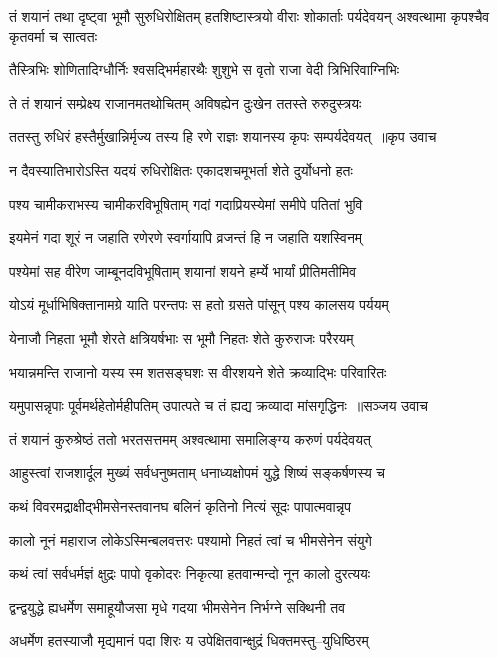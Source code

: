 \threelineshloka
{तं शयानं तथा दृष्ट्वा भूमौ सुरुधिरोक्षितम्}
{हतशिष्टास्त्रयो वीराः शोकार्ताः पर्यदेवयन्}
{अश्वत्थामा कृपश्चैव कृतवर्मा च सात्वतः}


\twolineshloka
{तैस्त्रिभिः शोणितादिग्धौर्निः श्वसद्भिर्महारथैः}
{शुशुभे स वृतो राजा वेदी त्रिभिरिवाग्निभिः}


\twolineshloka
{ते तं शयानं सम्प्रेक्ष्य राजानमतथोचितम्}
{अविषह्येन दुःखेन ततस्ते रुरुदुस्त्रयः}


\threelineshloka
{ततस्तु रुधिरं हस्तैर्मुखान्निर्मृज्य तस्य हि}
{रणे राज्ञः शयानस्य कृपः सम्पर्यदेवयत् ॥कृप उवाच}
{}


\twolineshloka
{न दैवस्यातिभारोऽस्ति यदयं रुधिरोक्षितः}
{एकादशचमूभर्ता शेते दुर्योधनो हतः}


\twolineshloka
{पश्य चामीकराभस्य चामीकरविभूषिताम्}
{गदां गदाप्रियस्येमां समीपे पतितां भुवि}


\twolineshloka
{इयमेनं गदा शूरं न जहाति रणेरणे}
{स्वर्गायापि व्रजन्तं हि न जहाति यशस्विनम्}


\twolineshloka
{पश्येमां सह वीरेण जाम्बूनदविभूषिताम्}
{शयानां शयने हर्म्ये भार्यां प्रीतिमतीमिव}


\twolineshloka
{योऽयं मूर्धाभिषिक्तानामग्रे याति परन्तपः}
{स हतो ग्रसते पांसून् पश्य कालसय पर्ययम्}


\twolineshloka
{येनाजौ निहता भूमौ शेरते क्षत्रियर्षभाः}
{स भूमौ निहतः शेते कुरुराजः परैरयम्}


\twolineshloka
{भयान्नमन्ति राजानो यस्य स्म शतसङ्घशः}
{स वीरशयने शेते क्रव्याद्भिः परिवारितः}


\threelineshloka
{यमुपासन्नृपाः पूर्वमर्थहेतोर्महीपतिम्}
{उपात्पते च तं ह्यद्य क्रव्यादा मांसगृद्धिनः ॥सञ्जय उवाच}
{}


\twolineshloka
{तं शयानं कुरुश्रेष्ठं ततो भरतसत्तमम्}
{अश्वत्थामा समालिङ्ग्य करुणं पर्यदेवयत्}


\twolineshloka
{आहुस्त्वां राजशार्दूल मुख्यं सर्वधनुष्मताम्}
{धनाध्यक्षोपमं युद्धे शिष्यं सङ्कर्षणस्य च}


\twolineshloka
{कथं विवरमद्राक्षीद्भीमसेनस्तवानघ}
{बलिनं कृतिनो नित्यं सूदः पापात्मवान्नृप}


\twolineshloka
{कालो नूनं महाराज लोकेऽस्मिन्बलवत्तरः}
{पश्यामो निहतं त्वां च भीमसेनेन संयुगे}


\twolineshloka
{कथं त्वां सर्वधर्मज्ञं क्षुद्रः पापो वृकोदरः}
{निकृत्या हतवान्मन्दो नून कालो दुरत्ययः}


\twolineshloka
{द्वन्द्वयुद्धे ह्यधर्मेण समाहूयौजसा मृधे}
{गदया भीमसेनेन निर्भग्ने सक्थिनी तव}


\twolineshloka
{अधर्मेण हतस्याजौ मृद्यमानं पदा शिरः}
{य उपेक्षितवान्क्षुद्रं धिक्तमस्तु--युधिष्ठिरम्}


